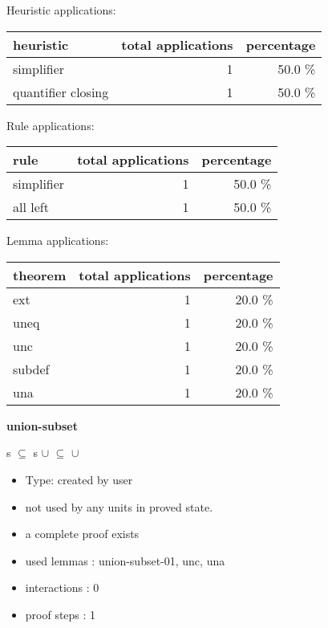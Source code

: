 \documentclass[a4paper]{article}
\begin{document}
\medskip


Heuristic applications:

\begin{supertabular}{l|r|r}
heuristic	& total applications & percentage \\ \hline
simplifier & 1 & 50.0 \% \\
quantifier closing & 1 & 50.0 \% \\

\end{supertabular}

Rule applications:

\begin{supertabular}{l|r|r}
rule	        & total applications & percentage \\ \hline
simplifier & 1 & 50.0 \% \\
all left & 1 & 50.0 \% \\

\end{supertabular}

Lemma applications:

\begin{supertabular}{l|r|r}
theorem	        & total applications & percentage \\ \hline
ext & 1 & 20.0 \% \\
uneq & 1 & 20.0 \% \\
unc & 1 & 20.0 \% \\
subdef & 1 & 20.0 \% \\
una & 1 & 20.0 \% \\

\end{supertabular}
\pagebreak

{\LARGE\bf union-subset}\label{lemma-union-subset}

\medskip

 \Fol s $\subseteq$  \Imp s $\cup$  $\subseteq$  $\cup$ 

\begin{itemize}

\item Type: created by user

\item not used by any units in proved state.
\item       a complete proof exists
\item       used lemmas  : union-subset-01, unc, una
\item       interactions : 0
\item       proof steps  : 1
\end{itemize}
\end{document}

